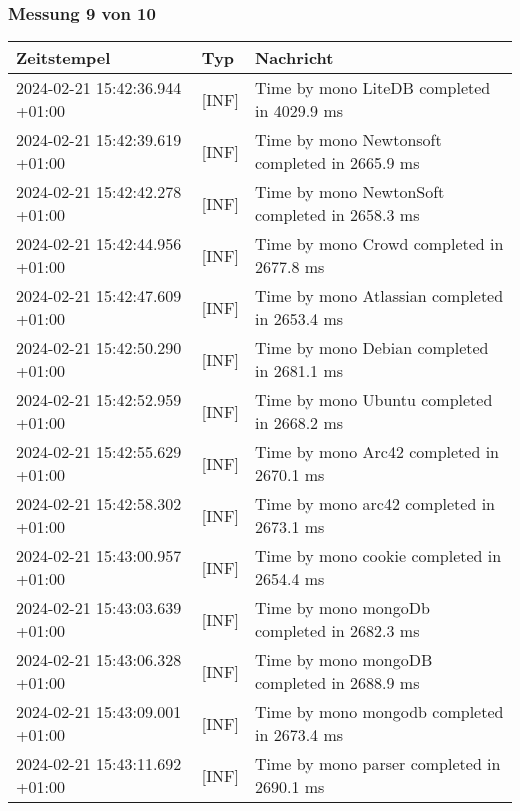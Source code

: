     \subsubsection*{Messung 9 von 10} \label{subsubsec:LiteDbMehrPaketeAlsDb9von10}
        {
            {\small
                \begin{tabularx}{\textwidth}{|l|l|X|}
                    \hline
                    \textbf{Zeitstempel} & \textbf{Typ} & \textbf{Nachricht} \\
                    \hline
                    \endhead
                    2024-02-21 15:42:36.944 +01:00 & [INF] & Time by mono LiteDB completed in 4029.9 ms \\
                    2024-02-21 15:42:39.619 +01:00 & [INF] & Time by mono Newtonsoft completed in 2665.9 ms \\
                    2024-02-21 15:42:42.278 +01:00 & [INF] & Time by mono NewtonSoft completed in 2658.3 ms \\
                    2024-02-21 15:42:44.956 +01:00 & [INF] & Time by mono Crowd completed in 2677.8 ms \\
                    2024-02-21 15:42:47.609 +01:00 & [INF] & Time by mono Atlassian completed in 2653.4 ms \\
                    2024-02-21 15:42:50.290 +01:00 & [INF] & Time by mono Debian completed in 2681.1 ms \\
                    2024-02-21 15:42:52.959 +01:00 & [INF] & Time by mono Ubuntu completed in 2668.2 ms \\
                    2024-02-21 15:42:55.629 +01:00 & [INF] & Time by mono Arc42 completed in 2670.1 ms \\
                    2024-02-21 15:42:58.302 +01:00 & [INF] & Time by mono arc42 completed in 2673.1 ms \\
                    2024-02-21 15:43:00.957 +01:00 & [INF] & Time by mono cookie completed in 2654.4 ms \\
                    2024-02-21 15:43:03.639 +01:00 & [INF] & Time by mono mongoDb completed in 2682.3 ms \\
                    2024-02-21 15:43:06.328 +01:00 & [INF] & Time by mono mongoDB completed in 2688.9 ms \\
                    2024-02-21 15:43:09.001 +01:00 & [INF] & Time by mono mongodb completed in 2673.4 ms \\
                    2024-02-21 15:43:11.692 +01:00 & [INF] & Time by mono parser completed in 2690.1 ms \\

\end{tabularx}}}
